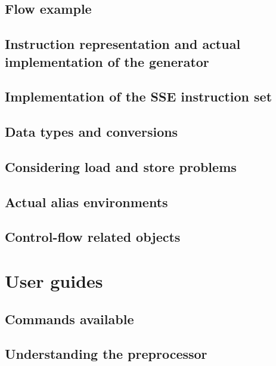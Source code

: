     \section{Flow example}

    \section{Instruction representation and actual implementation of the generator}


\section{Implementation of the SSE instruction set}

    \section{Data types and conversions}

    \section{Considering load and store problems} 

    \section{Actual alias environments} 
      

    \section{Control-flow related objects} 


\chapter{User guides}

    \section{Commands available}

    \section{Understanding the preprocessor}

